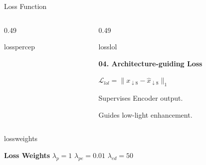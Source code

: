 ﻿\documentclass[
    11pt,%
    aspectratio=169,%
]{beamer}
\begin{document}
\begin{frame}{Loss Function}
\begin{columns}[T,onlytextwidth]
\begin{column}{0.49\textwidth}
\begin{beamercolorbox}[
    wd=\linewidth,
    sep=0.10cm,
    rounded=true
]{losspercep}
\end{beamercolorbox}

\end{column}


\begin{column}{0.49\textwidth}

\begin{beamercolorbox}[
    wd=\linewidth,
    sep=0.10cm,
    rounded=true
]{losslol}

    {\color{LossNavy}\bfseries 04. Architecture-guiding Loss}

    \vspace{0.10cm}

    \centering
    $\displaystyle
    \mathcal{L}_{lol}
    =
    \|x_{\downarrow 8}
    -
    \hat{x}_{\downarrow 8}\|_1
    $

    \vspace{0.08cm}

    \raggedright
    Supervises Encoder output.

    Guides low-light enhancement.

\end{beamercolorbox}

\end{column}

\end{columns}

\vspace{0.12cm}


\begin{beamercolorbox}[
    wd=\textwidth,
    sep=0.08cm,
    rounded=true
]{lossweights}

    \centering

    {\bfseries Loss Weights}
    \hspace{0.25cm}
    $\lambda_p=1$
    \qquad
    $\lambda_{pe}=0.01$
    \qquad
    $\lambda_{ed}=50$

\end{beamercolorbox}

\end{frame}


\end{document}
